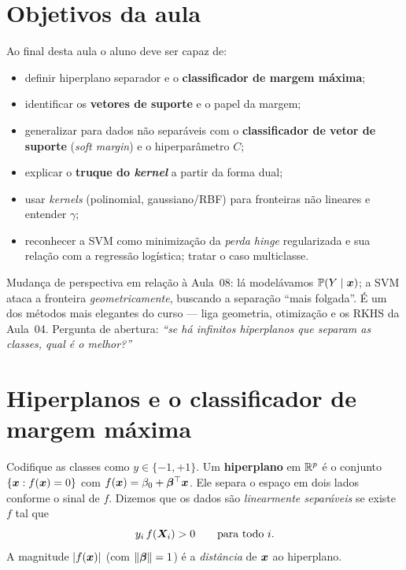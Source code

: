 \documentclass[11pt,a4paper]{article}
\begin{document}

\section*{Objetivos da aula}
Ao final desta aula o aluno deve ser capaz de:
\begin{itemize}[leftmargin=1.4cm]
  \item definir hiperplano separador e o \textbf{classificador de margem máxima};
  \item identificar os \textbf{vetores de suporte} e o papel da margem;
  \item generalizar para dados não separáveis com o \textbf{classificador de vetor
        de suporte} (\emph{soft margin}) e o hiperparâmetro $C$;
  \item explicar o \textbf{truque do \emph{kernel}} a partir da forma dual;
  \item usar \emph{kernels} (polinomial, gaussiano/RBF) para fronteiras não
        lineares e entender $\gamma$;
  \item reconhecer a SVM como minimização da \emph{perda \emph{hinge}} regularizada
        e sua relação com a regressão logística; tratar o caso multiclasse.
\end{itemize}

\begin{emsala}
Mudança de perspectiva em relação à Aula~08: lá modelávamos $\mathbb{P}(Y\mid\bm{x})$; a SVM
ataca a fronteira \emph{geometricamente}, buscando a separação ``mais folgada''. É
um dos métodos mais elegantes do curso --- liga geometria, otimização e os RKHS da
Aula~04. Pergunta de abertura: \emph{``se há infinitos hiperplanos que separam as
classes, qual é o melhor?''}
\end{emsala}

\section{Hiperplanos e o classificador de margem máxima}
Codifique as classes como $y\in\{-1,+1\}$. Um \textbf{hiperplano} em $\mathbb{R}^p$ é o
conjunto $\{\bm{x}: f(\bm{x})=0\}$ com $f(\bm{x})=\beta_0+\bm{\beta}^\top\bm{x}$. Ele separa o espaço
em dois lados conforme o sinal de $f$. Dizemos que os dados são \emph{linearmente
separáveis} se existe $f$ tal que
\begin{equation}\label{eq:sep}
  y_i\,f(\bm{X}_i) > 0 \qquad \text{para todo } i.
\end{equation}
A magnitude $\left\lvert f(\bm{x}) \right\rvert$ (com $\left\lVert \bm{\beta} \right\rVert=1$) é a \emph{distância} de $\bm{x}$ ao
hiperplano.
\end{document}
